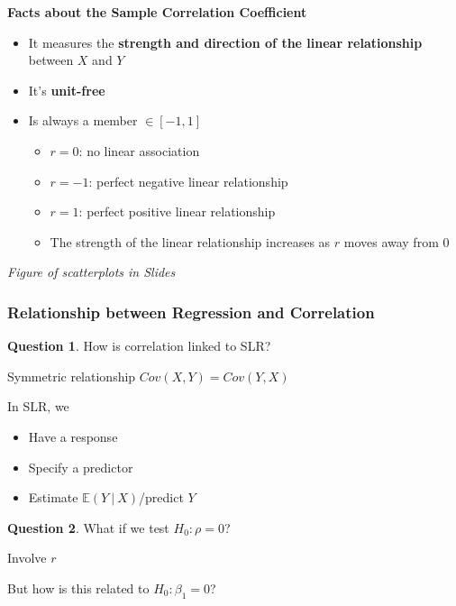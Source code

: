 \documentclass[11pt]{article}
\theoremstyle{definition}
\newtheorem{question}{Question}[section]
\numberwithin{equation}{section}
\begin{document}
\textbf{Facts about the Sample Correlation Coefficient}
\begin{itemize}
  \item It measures the \textbf{strength and direction of the linear relationship} between $X$ and $Y$
  \item It's \textbf{unit-free}
  \item Is always a member $\in[-1,1]$
  \begin{itemize}
    \item $r = 0$: no linear association
    \item $r = -1$: perfect negative linear relationship
    \item $r = 1$: perfect positive linear relationship
    \item The strength of the linear relationship increases as $r$ moves away from $0$
  \end{itemize}
\end{itemize}

\textit{Figure of scatterplots in Slides}

\subsubsection{Relationship between Regression and Correlation}
\begin{question}
  How is correlation linked to SLR?
\end{question}
\begin{writenotes}
  Symmetric relationship $Cov(X, Y) = Cov(Y, X)$

  In SLR, we
  \begin{itemize}
    \item Have a response
    \item Specify a predictor
    \item Estimate $\mathbb{E}(Y\>|\>X)$/predict $Y$
  \end{itemize}
\end{writenotes}

\begin{question}
  What if we test $H_0:\rho=0$?
\end{question}
\begin{writenotes}
  Involve $r$

  But how is this related to $H_0:\beta_1=0$?
\end{writenotes}
\end{document}
